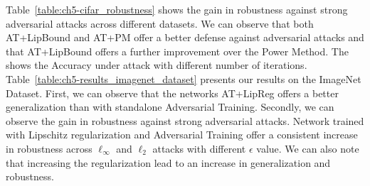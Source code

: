 Table~\ref{table:ch5-cifar_robustness} shows the gain in robustness against strong adversarial attacks across different datasets.
We can observe that both AT+LipBound and AT+PM offer a better defense against adversarial attacks and that AT+LipBound offers a further improvement over the Power Method.
The  shows the Accuracy under attack with different number of iterations.
Table~\ref{table:ch5-results_imagenet_dataset} presents our results on the ImageNet Dataset.
First, we can observe that the networks AT+LipReg offers a better generalization than with standalone Adversarial Training.
Secondly, we can observe the gain in robustness against strong adversarial attacks.
Network trained with Lipschitz regularization and Adversarial Training offer a consistent increase in robustness across $\ell_\infty$ and $\ell_2$ attacks with different $\epsilon$ value.
We can also note that increasing the regularization lead to an increase in generalization and robustness.

